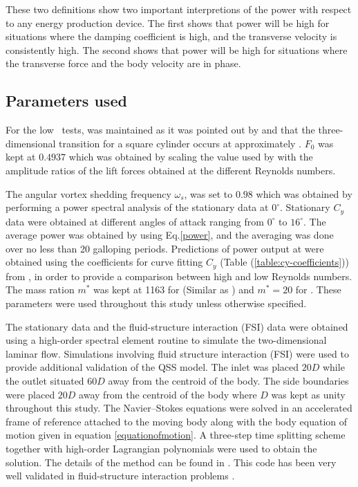 These two definitions show two important interpretions of the power with respect to any energy production device. The first shows that power will be high for situations where the damping coefficient is high, and the transverse velocity is consistently high. The second shows that power will be high for situations where the transverse force and the body velocity are in phase.
 
 

 
 
\subsection{Parameters used} 
 
For the low \reynoldsnumber\ tests,  was maintained as it was pointed out by \citet{Sheard2009} and \citet{Tong2008} that the three-dimensional transition for a square cylinder occurs at approximately . $F_0$ was kept at $0.4937$ which was obtained by scaling the value used by \citet{Joly2012} with the amplitude ratios of the lift forces obtained at the different Reynolds numbers. 

The angular vortex shedding frequency $\omega_s$, was set to $0.98$ which was obtained by performing a power spectral analysis of the stationary data at $0^\circ$. Stationary $C_y$ data were obtained at different angles of attack ranging from $0^\circ$ to $16^\circ$. The average power was obtained by using Eq.\eqref{power}, and the averaging was done over no less than 20 galloping periods. Predictions of power output at  were obtained using the coefficients for curve fitting $C_y$ (Table (\ref{table:cy-coefficients})) from \citet{Parkinson1964}, in order to provide a comparison between high and low Reynolds numbers. The mass ration $m^*$ was kept at 1163 for  (Similar as \citet{Parkinson1964}) and $m^*=20$ for . These parameters were used throughout this study unless otherwise specified. 

The stationary data and the fluid-structure interaction (FSI) data were obtained using a high-order spectral element routine to simulate the two-dimensional laminar flow.  Simulations involving fluid structure interaction (FSI) were used to provide additional validation of the QSS model. The inlet was placed $20D$ while the outlet situated $60D$ away from the centroid of the body. The side boundaries were placed $20D$ away from the centroid of the body where $D$ was kept as unity throughout this study. The Navier--Stokes equations were solved in an accelerated frame of reference attached to the moving body along with the body equation of motion given in equation \ref{equationofmotion}. A three-step time splitting scheme together with high-order Lagrangian polynomials were used to obtain the solution. The details of the method can be found in \cite{Thompson2006,Thompson1996a}. This code has been very well validated in fluid-structure interaction problems \citep{Leontini2011,Leontini2007a}.
 
